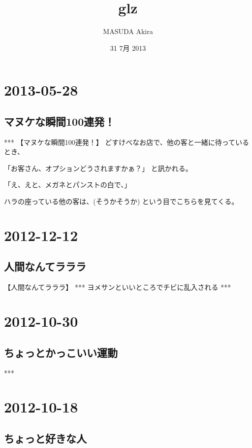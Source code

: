 \documentclass[11pt]{article}
\title{glz}
\author{MASUDA Akira}
\date{31 7月 2013}
\begin{document}
\maketitle

\setcounter{tocdepth}{3}
\tableofcontents
\vspace*{1cm}
\section{2013-05-28}
\label{sec-1}
\subsection{マヌケな瞬間100連発！}
\label{sec-1_1}

***
【マヌケな瞬間100連発！】
どすけべなお店で、他の客と一緒に待っているとき、

「お客さん、オプションどうされますかぁ？」
と訊かれる。

「え、えと、メガネとパンストの白で、」

ハラの座っている他の客は、(そうかそうか) という目でこちらを見てくる。
\section{2012-12-12}
\label{sec-2}
\subsection{人間なんてラララ}
\label{sec-2_1}

【人間なんてラララ】
***
ヨメサンといいところでチビに乱入される
***
\section{2012-10-30}
\label{sec-3}
\subsection{ちょっとかっこいい運動}
\label{sec-3_1}

***
\section{2012-10-18}
\label{sec-4}
\subsection{ちょっと好きな人}
\label{sec-4_1}
\subsection{}
\end{document}
